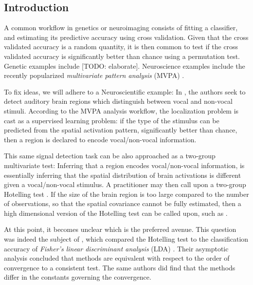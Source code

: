 \documentclass{pnastwo}
\begin{document}
\begin{article}

\begin{abstract}
[TODO]
\end{abstract}





\section{Introduction}

A common workflow in genetics or neuroimaging consists of fitting a classifier, and estimating its predictive accuracy using cross validation. 
Given that the cross validated accuracy is a random quantity, it is then common to test if the cross validated accuracy is significantly better than chance using a permutation test.  
Genetic examples include [TODO: elaborate]\cite{jiang_calculating_2008,radmacher_paradigm_2002-1}.
Neuroscience examples include the recently popularized \emph{multivariate pattern analysis} (MVPA) \cite{kriegeskorte_information-based_2006,varoquaux_assessing_2016,golland_permutation_2003}.

To fix ideas, we will adhere to a Neuroscientific example: 
In \cite{gilron_quantifying_2016}, the authors seek to detect auditory brain regions which distinguish between vocal and non-vocal stimuli. 
According to the MVPA analysis workflow, the localization problem is cast as a supervised learning problem: if the type of the stimulus can be predicted from the spatial activation pattern, significantly better than chance, then a region is declared to encode vocal/non-vocal information. 

This same signal detection task can be also approached as a two-group multivariate test:
Inferring that a region encodes vocal/non-vocal information, is essentially inferring that the spatial distribution of brain activations is different given a vocal/non-vocal stimulus. 
A practitioner may then call upon a two-group Hotelling test \cite{fujikoshi_multivariate_2011}. 
If the size of the brain region is too large compared to the number of observations, so that the spatial covariance cannot be fully estimated, then a high dimensional version of the Hotelling test can be called upon, such as  \cite{srivastava_testing_2013}.

At this point, it becomes unclear which is the preferred avenue. 
This question was indeed the subject of \cite{ramdas_classification_2016}, which compared the Hotelling test to the classification accuracy of \emph{Fisher's linear discriminant analysis} (LDA) \cite{hastie_elements_2003-1}. 
Their asymptotic analysis concluded that methods are equivalent with respect to the order of convergence to a consistent test. The same authors did find that the methods differ in the constants governing the convergence.


\end{article}
\end{document}
